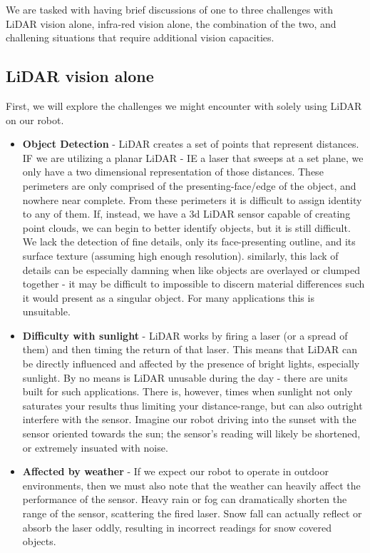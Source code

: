 \documentclass{article}
\begin{document}
We are tasked with having brief discussions of one to three challenges with LiDAR vision alone, infra-red vision alone, the combination of the two, and challening situations that require additional vision capacities.

\subsection*{LiDAR vision alone}

First, we will explore the challenges we might encounter with solely using LiDAR on our robot.

\begin{itemize}
    \item \textbf{Object Detection} - LiDAR creates a set of points that represent distances. IF we are utilizing a planar LiDAR - IE a laser that sweeps at a set plane, we only have a two dimensional representation of those distances. These perimeters are only comprised of the presenting-face/edge of the object, and nowhere near complete. From these perimeters it is difficult to assign identity to any of them. If, instead, we have a 3d LiDAR sensor capable of creating point clouds, we can begin to better identify objects, but it is still difficult. We lack the detection of fine details, only its face-presenting outline, and its surface texture (assuming high enough resolution). similarly, this lack of details can be especially damning when like objects are overlayed or clumped together - it may be difficult to impossible to discern material differences such it would present as a singular object. For many applications this is unsuitable.
    \item \textbf{Difficulty with sunlight} - LiDAR works by firing a laser (or a spread of them) and then timing the return of that laser. This means that LiDAR can be directly influenced and affected by the presence of bright lights, especially sunlight. By no means is LiDAR unusable during the day - there are units built for such applications. There is, however, times when sunlight not only saturates your results thus limiting your distance-range, but can also outright interfere with the sensor. Imagine our robot driving into the sunset with the sensor oriented towards the sun; the sensor's reading will likely be shortened, or extremely insuated with noise.
    \item \textbf{Affected by weather} - If we expect our robot to operate in outdoor environments, then we must also note that the weather can heavily affect the performance of the sensor. Heavy rain or fog can dramatically shorten the range of the sensor, scattering the fired laser. Snow fall can actually reflect or absorb the laser oddly, resulting in incorrect readings for snow covered objects.
\end{itemize}
\end{document}
